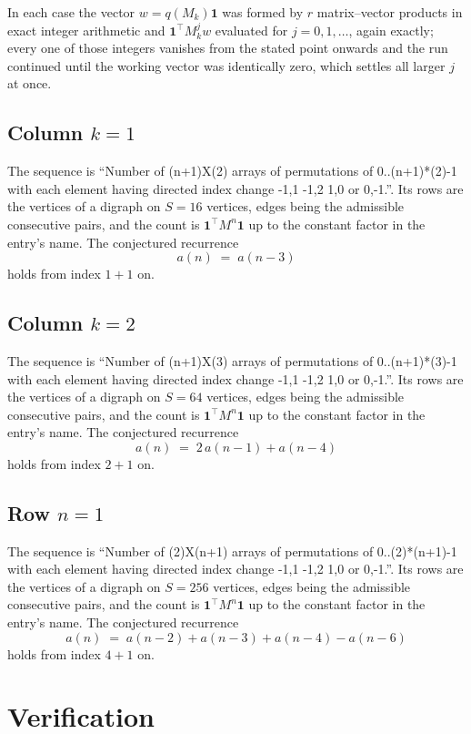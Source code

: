 \documentclass[11pt,a4paper]{article}
\theoremstyle{plain}
\theoremstyle{definition}
\begin{document}
In each case the vector $w=q(M_k)\mathbf{1}$ was formed by $r$ matrix--vector products in
exact integer arithmetic and $\mathbf{1}^{\!\top}M_k^{j}w$ evaluated for $j=0,1,\dots$,
again exactly; every one of those integers vanishes from the stated point onwards and the run
continued until the working vector was identically zero, which settles all larger $j$ at once.

\subsection*{Column $k$$=1$}
The sequence is ``Number of (n+1)X(2) arrays of permutations of 0..(n+1)*(2)-1 with each element having directed index change -1,1 -1,2 1,0 or 0,-1.''. Its rows are the vertices of a digraph on
$S=16$ vertices, edges being the admissible consecutive pairs, and the count is
$\mathbf{1}^{\!\top}M^{n}\mathbf{1}$ up to the constant factor in the entry's name.
The conjectured recurrence
\[
a(n)\;=\;a(n-3)
\]
holds from index $1+1$ on.

\subsection*{Column $k$$=2$}
The sequence is ``Number of (n+1)X(3) arrays of permutations of 0..(n+1)*(3)-1 with each element having directed index change -1,1 -1,2 1,0 or 0,-1.''. Its rows are the vertices of a digraph on
$S=64$ vertices, edges being the admissible consecutive pairs, and the count is
$\mathbf{1}^{\!\top}M^{n}\mathbf{1}$ up to the constant factor in the entry's name.
The conjectured recurrence
\[
a(n)\;=\;2\,a(n-1) + a(n-4)
\]
holds from index $2+1$ on.

\subsection*{Row $n$$=1$}
The sequence is ``Number of (2)X(n+1) arrays of permutations of 0..(2)*(n+1)-1 with each element having directed index change -1,1 -1,2 1,0 or 0,-1.''. Its rows are the vertices of a digraph on
$S=256$ vertices, edges being the admissible consecutive pairs, and the count is
$\mathbf{1}^{\!\top}M^{n}\mathbf{1}$ up to the constant factor in the entry's name.
The conjectured recurrence
\[
a(n)\;=\;a(n-2) + a(n-3) + a(n-4) - a(n-6)
\]
holds from index $4+1$ on.

\section{Verification}
\end{document}
